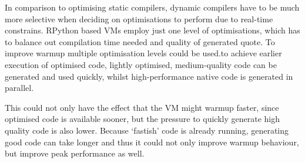 In comparison to optimising static compilers, dynamic compilers have to be much
more selective when deciding on optimisations to perform due to real-time
constrains. RPython based VMs employ just one level of optimisations, which has
to balance out compilation time needed and quality of generated quote. To
improve warmup multiple optimisation levels could be used.to achieve earlier
execution of optimised code, lightly optimised, medium-quality code can be
generated and used quickly, whilst high-performance native code is generated in
parallel.

This could not only have the effect that the VM might warmup faster, since
optimised code is available sooner, but the pressure to quickly generate high
quality code is also lower. Because `fastish' code is already running,
generating good code can take longer and thus it could not only improve warmup
behaviour, but improve peak performance as well.


